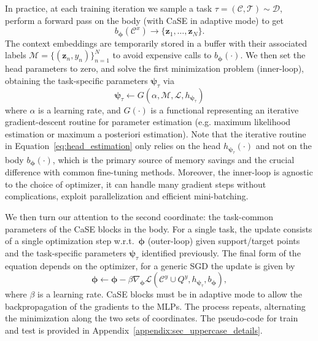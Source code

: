\documentclass{article}
\begin{document}
In practice, at each training iteration we sample a task $\tau=(\mathcal{C}, \mathcal{T}) \sim \mathcal{D}$, perform a forward pass on the body (with CaSE in adaptive mode) to get
\begin{equation} \label{eq:forward_to_embeddings}
      b_{\boldsymbol{\phi}}(\mathcal{C}^x) \rightarrow \{ \mathbf{z}_1, \dots, \mathbf{z}_N \}.
\end{equation}
The context embeddings are temporarily stored in a buffer with their associated labels $\mathcal{M} = \{ (\mathbf{z}_n, y_n) \}_{n=1}^{N}$ to avoid expensive calls to $b_{\boldsymbol{\phi}}(\cdot)$. We then set the head parameters to zero, and solve the first minimization problem (inner-loop), obtaining the task-specific parameters $\boldsymbol{\psi}_\tau$ via
\begin{equation} \label{eq:head_estimation}
   \boldsymbol{\psi}_\tau \leftarrow G\left(\alpha, \mathcal{M}, \mathcal{L}, h_{\boldsymbol{\psi}_\tau} \right)
\end{equation}
where $\alpha$ is a learning rate, and $G(\cdot)$ is a functional representing an iterative gradient-descent routine for parameter estimation (e.g. maximum likelihood estimation or maximum a posteriori estimation). Note that the iterative routine in Equation~\eqref{eq:head_estimation} only relies on the head $h_{\boldsymbol{\psi}_\tau}(\cdot)$ and not on the body $ b_{\boldsymbol{\phi}}(\cdot)$, which is the primary source of memory savings and the crucial difference with common fine-tuning methods. Moreover, the inner-loop is agnostic to the choice of optimizer, it can handle many gradient steps without complications, exploit parallelization and efficient mini-batching.

We then turn our attention to the second coordinate: the task-common parameters of the CaSE blocks in the body. For a single task, the update consists of a single optimization step w.r.t.~$\boldsymbol{\phi}$ (outer-loop) given support/target points and the task-specific parameters $\boldsymbol{\psi}_\tau$ identified previously. The final form of the equation depends on the optimizer, for a generic SGD the update is given by
\begin{equation} \label{eq:body_update}
   \boldsymbol{\phi} \leftarrow \boldsymbol{\phi} - \beta \nabla_{\boldsymbol{\phi}} \mathcal{L} \left(\mathcal{C}^y \cup Q^y, h_{\boldsymbol{\psi}_\tau}, b_{\boldsymbol{\phi}} \right),
\end{equation}
where $\beta$ is a learning rate. CaSE blocks must be in adaptive mode to allow the backpropagation of the gradients to the MLPs. The process repeats, alternating the minimization along the two sets of coordinates. The pseudo-code for train and test is provided in Appendix~\ref{appendix:sec_uppercase_details}.
\end{document}
